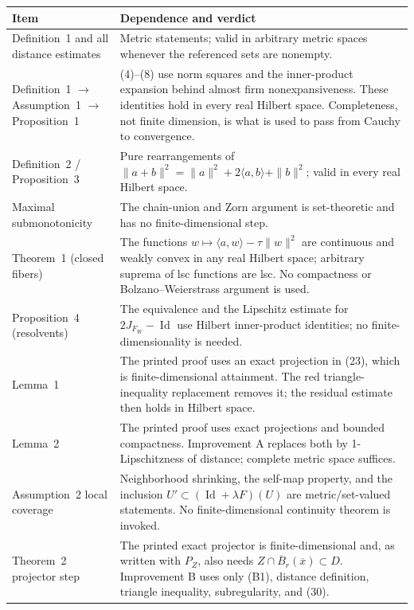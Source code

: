 \documentclass[11pt]{article}
\newcommand{\Id}{\operatorname{Id}}
\newcommand{\barx}{\overline{x}}
\begin{document}
\begin{center}
\begin{tabular}{p{}p{}}
\hline
\textbf{Item} & \textbf{Dependence and verdict}\\
\hline
Definition~1 and all distance estimates & Metric statements; valid in arbitrary metric spaces whenever the referenced sets are nonempty.\\
Definition~1 $\to$ Assumption~1 $\to$ Proposition~1 & (4)--(8) use norm squares and the inner-product expansion behind almost firm nonexpansiveness. These identities hold in every real Hilbert space. Completeness, not finite dimension, is what is used to pass from Cauchy to convergence.\\
Definition~2 / Proposition~3 & Pure rearrangements of $\|a+b\|^2=\|a\|^2+2\langle a,b\rangle+\|b\|^2$; valid in every real Hilbert space.\\
Maximal submonotonicity & The chain-union and Zorn argument is set-theoretic and has no finite-dimensional step.\\
Theorem~1 (closed fibers) & The functions $w\mapsto\langle a,w\rangle-\tau\|w\|^2$ are continuous and weakly convex in any real Hilbert space; arbitrary suprema of lsc functions are lsc. No compactness or Bolzano--Weierstrass argument is used.\\
Proposition~4 (resolvents) & The equivalence and the Lipschitz estimate for $2J_{F_W}-\Id$ use Hilbert inner-product identities; no finite-dimensionality is needed.\\
Lemma~1 & The printed proof uses an exact projection in (23), which is finite-dimensional attainment. The red triangle-inequality replacement removes it; the residual estimate then holds in Hilbert space.\\
Lemma~2 & The printed proof uses exact projections and bounded compactness. Improvement A replaces both by 1-Lipschitzness of distance; complete metric space suffices.\\
Assumption~2 local coverage & Neighborhood shrinking, the self-map property, and the inclusion $U'\subset(\Id+\lambda F)(U)$ are metric/set-valued statements. No finite-dimensional continuity theorem is invoked.\\
Theorem~2 projector step & The printed exact projector is finite-dimensional and, as written with $P_Z$, also needs $Z\cap\overline B_r(\barx)\subset D$. Improvement B uses only (B1), distance definition, triangle inequality, subregularity, and (30).\\
\hline
\end{tabular}
\end{center}
\end{document}
